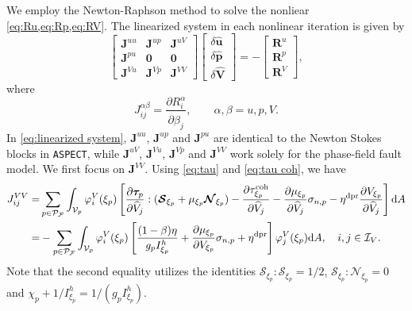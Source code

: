 \documentclass{article}
\begin{document}
We employ the Newton-Raphson method to solve the nonliear \cref{eq:Ru,eq:Rp,eq:RV}. The linearized system in each nonlinear iteration is given by
\begin{equation}\label{eq:linearized system}
  \begin{bmatrix}
    \mathbf J^{uu} & \mathbf J^{up} & \mathbf J^{uV} \\ \mathbf J^{pu} & \mathbf 0 & \mathbf 0 \\ \mathbf J^{Vu} & \mathbf J^{Vp} & \mathbf J^{VV}
  \end{bmatrix}
  \begin{bmatrix}
    \delta\hat{\mathbf u} \\ \delta\hat{\mathbf p} \\ \delta\widehat{\mathbf V}
  \end{bmatrix}
  = -
  \begin{bmatrix}
    \mathbf R^u \\ \mathbf R^p \\ \mathbf R^V
  \end{bmatrix},
\end{equation}
where
\[
  J_{ij}^{\alpha\beta} = \frac{\partial R^\alpha_i}{\partial\widehat\beta_j},\qquad\alpha,\beta = u, p, V.
\]
In \cref{eq:linearized system}, $\mathbf J^{uu}$, $\mathbf J^{up}$ and $\mathbf J^{pu}$ are identical to the Newton Stokes blocks in \texttt{ASPECT}, while $\mathbf J^{uV}$, $\mathbf J^{Vu}$, $\mathbf J^{Vp}$ and $\mathbf J^{VV}$ work solely for the phase-field fault model. We first focus on $\mathbf J^{VV}$. Using \eqref{eq:tau} and \eqref{eq:tau coh}, we have
\begin{equation}\label{eq:J VV}
  \begin{aligned}
    J^{VV}_{ij} 
    =&\sum_{p\in\mathcal P_{\mathcal F}}\int_{\mathcal V_p}\varphi_i^V(\xi_p)
      \left[\frac{\partial\bm\tau_p}{\partial\widehat V_j} : (\bm{\mathcal S}_{\xi_p} + \mu_{\xi_p}\bm{\mathcal N}_{\xi_p})
      - \frac{\partial\tau_{\xi_p}^{\rm coh}}{\partial\widehat V_j}
      - \frac{\partial\mu_{\xi_p}}{\partial\widehat V_j}\sigma_{n,p}
      - \eta^{\rm dpr}\frac{\partial V_{\xi_p}}{\partial\widehat V_j}\right]\mathrm dA \\
    =&-\sum_{p\in\mathcal P_{\mathcal F}}\int_{\mathcal V_p}\varphi_i^V(\xi_p)
      \left[\frac{(1-\beta)\eta}{g_pI^h_{\xi_p}}
      + \frac{\partial\mu_{\xi_p}}{\partial V_{\xi_p}}\sigma_{n,p}
      + \eta^{\rm dpr}\right]\varphi^V_j(\xi_p)\mathrm dA,\quad i,j\in\mathcal I_V.
  \end{aligned}
\end{equation}
Note that the second equality utilizes the identities $\bm{\mathcal S}_{\xi_p} : \bm{\mathcal S}_{\xi_p} = 1/2$, $\bm{\mathcal S}_{\xi_p} : \bm{\mathcal N}_{\xi_p} = 0$ and $\chi_p + 1/I^h_{\xi_p} = 1/(g_pI^h_{\xi_p})$.
\end{document}

